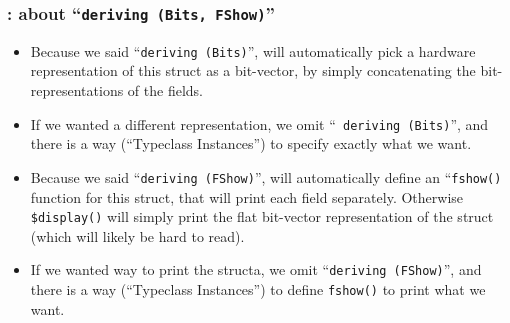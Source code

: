 \begin{frame}[fragile]
\frametitle{{\BSV}: about ``{\tt deriving (Bits, FShow)}''}

\footnotesize

\begin{itemize}

 \item Because we said ``{\tt deriving (Bits)}'', {\bsc} will
       automatically pick a hardware representation of this struct as
       a bit-vector, by simply concatenating the bit-representations
       of the fields.

 \item If we wanted a different representation, we omit ``{\tt
       deriving (Bits)}'', and there is a way (``Typeclass
       Instances'') to specify exactly what we want.

\end{itemize}

\PAUSE{\vspace*{5ex}}

\begin{itemize}

 \item Because we said ``{\tt deriving (FShow)}'', {\bsc} will
       automatically define an ``{\tt fshow()} function for this
       struct, that will print each field separately.  Otherwise {\tt
       \$display()} will simply print the flat bit-vector
       representation of the struct (which will likely be hard to
       read).

 \item If we wanted way to print the structa, we omit ``{\tt deriving
       (FShow)}'', and there is a way (``Typeclass Instances'') to
       define {\tt fshow()} to print what we want.

\end{itemize}

\end{frame}


